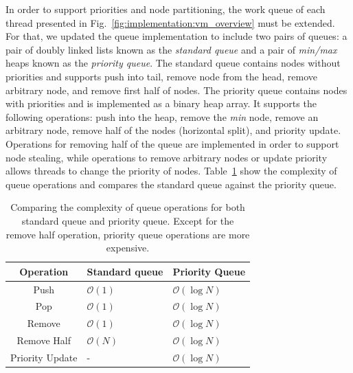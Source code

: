 In order to support priorities and node partitioning, the work queue of each
thread presented in Fig.~\ref{fig:implementation:vm_overview} must be extended.
For that, we updated the queue implementation to include two pairs of queues:
a pair of doubly linked lists known as the \emph{standard queue} and a pair of
\emph{min/max} heaps known as the \emph{priority queue}.  The standard queue
contains nodes without priorities and supports push into tail, remove node from
the head, remove arbitrary node, and remove first half of nodes.  The priority
queue contains nodes with priorities and is implemented as a binary heap array.
It supports the following operations: push into the heap, remove the \emph{min}
node, remove an arbitrary node, remove half of the nodes (horizontal split), and
priority update.  Operations for removing half of the queue are implemented in
order to support node stealing, while operations to remove arbitrary nodes or
update priority allows threads to change the priority of nodes.
Table~\ref{fig:implementation:table_queue} show the complexity of queue
operations and compares the standard queue against the priority queue.

\begin{table}[h]
   \begin{tabular}{| c | l | l |}
      \hline
      \textbf{Operation} & \textbf{Standard queue} & \textbf{Priority Queue} \\
      \hline
      Push & $\mathcal{O}(1)$ & $\mathcal{O}(\log{N})$ \\ \hline
      Pop & $\mathcal{O}(1)$ & $\mathcal{O}(\log{N})$ \\ \hline
      Remove & $\mathcal{O}(1)$ & $\mathcal{O}(\log{N})$ \\ \hline
      Remove Half & $\mathcal{O}(N)$ & $\mathcal{O}(\log{N})$ \\ \hline
      Priority Update & - & $\mathcal{O}(\log{N})$ \\ \hline
   \end{tabular}
   \caption{Comparing the complexity of queue operations for both standard
      queue and priority queue. Except for the remove half operation, priority
      queue operations are more expensive.}
   \label{fig:implementation:table_queue}
\end{table}

